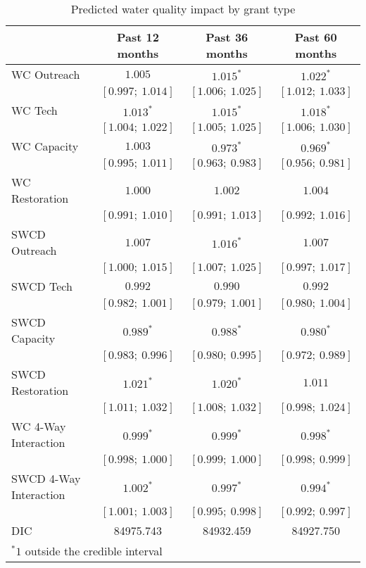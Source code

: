 
\begin{table}
\caption{Predicted water quality impact by grant type}
\begin{center}
\begin{tabular}{l c c c }
\hline
                       & Past 12 months & Past 36 months & Past 60 months \\
\hline
WC Outreach            & $1.005$           & $1.015^{*}$       & $1.022^{*}$       \\
                       & $[0.997;\ 1.014]$ & $[1.006;\ 1.025]$ & $[1.012;\ 1.033]$ \\
WC Tech                & $1.013^{*}$       & $1.015^{*}$       & $1.018^{*}$       \\
                       & $[1.004;\ 1.022]$ & $[1.005;\ 1.025]$ & $[1.006;\ 1.030]$ \\
WC Capacity            & $1.003$           & $0.973^{*}$       & $0.969^{*}$       \\
                       & $[0.995;\ 1.011]$ & $[0.963;\ 0.983]$ & $[0.956;\ 0.981]$ \\
WC Restoration         & $1.000$           & $1.002$           & $1.004$           \\
                       & $[0.991;\ 1.010]$ & $[0.991;\ 1.013]$ & $[0.992;\ 1.016]$ \\
SWCD Outreach          & $1.007$           & $1.016^{*}$       & $1.007$           \\
                       & $[1.000;\ 1.015]$ & $[1.007;\ 1.025]$ & $[0.997;\ 1.017]$ \\
SWCD Tech              & $0.992$           & $0.990$           & $0.992$           \\
                       & $[0.982;\ 1.001]$ & $[0.979;\ 1.001]$ & $[0.980;\ 1.004]$ \\
SWCD Capacity          & $0.989^{*}$       & $0.988^{*}$       & $0.980^{*}$       \\
                       & $[0.983;\ 0.996]$ & $[0.980;\ 0.995]$ & $[0.972;\ 0.989]$ \\
SWCD Restoration       & $1.021^{*}$       & $1.020^{*}$       & $1.011$           \\
                       & $[1.011;\ 1.032]$ & $[1.008;\ 1.032]$ & $[0.998;\ 1.024]$ \\
WC 4-Way Interaction   & $0.999^{*}$       & $0.999^{*}$       & $0.998^{*}$       \\
                       & $[0.998;\ 1.000]$ & $[0.999;\ 1.000]$ & $[0.998;\ 0.999]$ \\
SWCD 4-Way Interaction & $1.002^{*}$       & $0.997^{*}$       & $0.994^{*}$       \\
                       & $[1.001;\ 1.003]$ & $[0.995;\ 0.998]$ & $[0.992;\ 0.997]$ \\
\hline
DIC                    & 84975.743         & 84932.459         & 84927.750         \\
\hline
\multicolumn{4}{l}{\scriptsize{$^* 1$ outside the credible interval}}
\end{tabular}
\label{table:typefunding}
\end{center}
\end{table}
